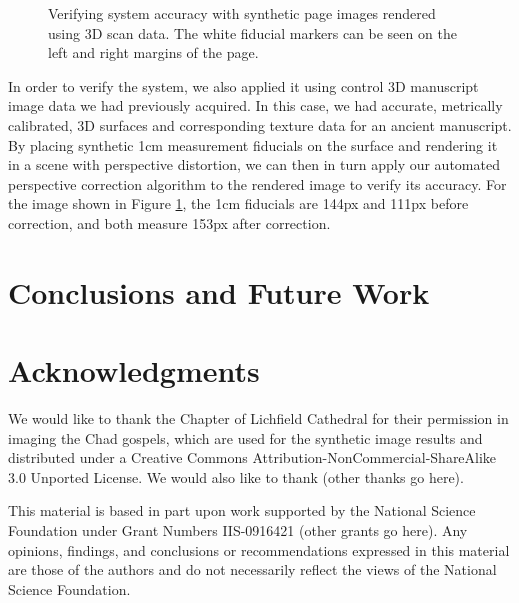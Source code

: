 \documentclass[runningheads,a4paper]{llncs}
\begin{document}
\begin{figure}[h!tbm]
  \centering

  
  \caption{Verifying system accuracy with synthetic page images rendered using 3D scan data. The white fiducial markers can be seen on the left and right margins of the page.}\label{fig:synthetic}
\end{figure}

In order to verify the system, we also applied it using control 3D manuscript image data we had previously acquired.
In this case, we had accurate, metrically calibrated, 3D surfaces and corresponding texture data for an ancient manuscript. By placing synthetic 1cm measurement fiducials on the surface and rendering it in a scene with perspective distortion,
we can then in turn apply our automated perspective correction algorithm to the rendered image to verify its accuracy. For the image shown in Figure \ref{fig:synthetic}, the 1cm fiducials are 144px and 111px before correction, and both measure 153px after correction.

\section{Conclusions and Future Work}

\section{Acknowledgments}

We would like to thank the Chapter of Lichfield Cathedral for their permission in imaging the Chad gospels,
which are used for the synthetic image results and distributed under a Creative Commons Attribution-NonCommercial-ShareAlike 3.0 Unported License. We would also like to thank (other thanks go here).

This material is based in part upon work supported by the National Science Foundation under Grant Numbers
IIS-0916421 (other grants go here).
Any opinions, findings, and conclusions or recommendations expressed in this material are those of the authors
and do not necessarily reflect the views of the National Science Foundation.



\end{document}
